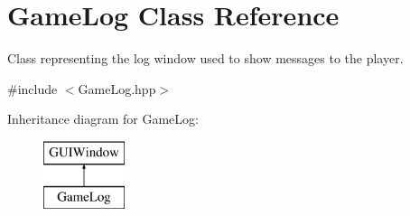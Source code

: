 \hypertarget{class_game_log}{}\section{Game\+Log Class Reference}
\label{class_game_log}


Class representing the log window used to show messages to the player.  




{\ttfamily \#include $<$Game\+Log.\+hpp$>$}

Inheritance diagram for Game\+Log\+:\begin{figure}[H]
\begin{center}
\leavevmode
\includegraphics[height=2.000000cm]{class_game_log}
\end{center}
\end{figure}
